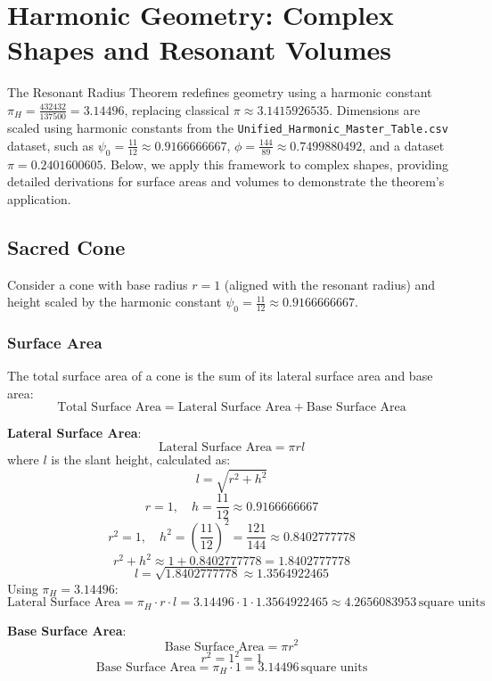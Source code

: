 
\section{Harmonic Geometry: Complex Shapes and Resonant Volumes}

The Resonant Radius Theorem redefines geometry using a harmonic constant \(\pi_H = \frac{432432}{137500} = 3.14496\), replacing classical \(\pi \approx 3.1415926535\). Dimensions are scaled using harmonic constants from the \texttt{Unified\_Harmonic\_Master\_Table.csv} dataset, such as \(\psi_0 = \frac{11}{12} \approx 0.9166666667\), \(\phi = \frac{144}{89} \approx 0.7499880492\), and a dataset \(\pi = 0.2401600605\). Below, we apply this framework to complex shapes, providing detailed derivations for surface areas and volumes to demonstrate the theorem’s application.

\subsection{Sacred Cone}
Consider a cone with base radius \( r = 1 \) (aligned with the resonant radius) and height scaled by the harmonic constant \(\psi_0 = \frac{11}{12} \approx 0.9166666667\).

\subsubsection{Surface Area}
The total surface area of a cone is the sum of its lateral surface area and base area:
\[
\text{Total Surface Area} = \text{Lateral Surface Area} + \text{Base Surface Area}
\]

\textbf{Lateral Surface Area}: 
\[
\text{Lateral Surface Area} = \pi r l
\]
where \( l \) is the slant height, calculated as:
\[
l = \sqrt{r^2 + h^2}
\]
\[
r = 1, \quad h = \frac{11}{12} \approx 0.9166666667
\]
\[
r^2 = 1, \quad h^2 = \left(\frac{11}{12}\right)^2 = \frac{121}{144} \approx 0.8402777778
\]
\[
r^2 + h^2 \approx 1 + 0.8402777778 = 1.8402777778
\]
\[
l = \sqrt{1.8402777778} \approx 1.3564922465
\]
Using \(\pi_H = 3.14496\):
\[
\text{Lateral Surface Area} = \pi_H \cdot r \cdot l = 3.14496 \cdot 1 \cdot 1.3564922465 \approx 4.2656083953 \, \text{square units}
\]

\textbf{Base Surface Area}:
\[
\text{Base Surface Area} = \pi r^2
\]
\[
r^2 = 1^2 = 1
\]
\[
\text{Base Surface Area} = \pi_H \cdot 1 = 3.14496 \, \text{square units}
\]

